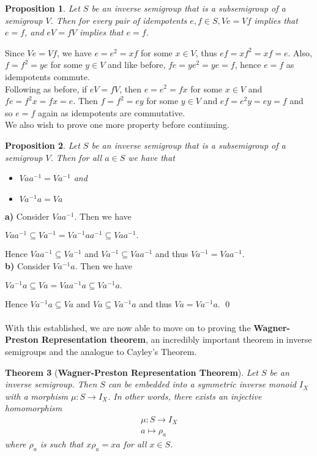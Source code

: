 \documentclass[12pt]{article}
\newtheorem{theorem}{Theorem}[subsection]
\newtheorem{prop}[theorem]{Proposition}
\begin{document}
\begin{prop}\label{prop4.4}
	Let $S$ be an inverse semigroup that is a subsemigroup of a semigroup $V$. Then for every pair of idempotents $e,f \in S, Ve = Vf$ implies that $e = f$, and $eV = fV$ implies that $e = f$.
\end{prop}
\proof
	Since $Ve = Vf$, we have $e = e^2 = xf$ for some $x \in V$, thus $ef = xf^2 = xf = e$. Also, $f = f^2 = ye$ for some $y \in V$ and like before, $fe = ye^2 = ye = f$, hence $e=f$ as idempotents commute.\\
	Following as before, if $eV = fV$, then $e = e^2 = fx$ for some $x \in V$ and $fe=f^2 x = fx = e$. Then $f = f^2 = ey$ for some $y \in V$ and $ef=e^2 y = ey = f$ and so $e = f$ again as idempotents are commutative.\\
We also wish to prove one more property before continuing.
\begin{prop}\label{prop4.5}
	Let $S$ be an inverse semigroup that is a subsemigroup of a semigroup $V$. Then for all $a \in S$ we have that
	\begin{itemize}
		\item[\textbf{a)}] $Vaa^{-1} = Va^{-1}$ and
		\item[\textbf{b)}] $Va^{-1}a = Va$
	\end{itemize}
\end{prop}
\proof
	\textbf{a)} Consider $Vaa^{-1}$. Then we have
	\begin{center}
		$Vaa^{-1} \subseteq Va^{-1} = Va^{-1}aa^{-1} \subseteq Vaa^{-1}.$
	\end{center}
	Hence $Vaa^{-1} \subseteq Va^{-1}$ and $Va^{-1} \subseteq Vaa^{-1}$ and thus $Va^{-1} = Vaa^{-1}$.
	\\\textbf{b)} Consider $Va^{-1}a$. Then we have
	\begin{center}
		$Va^{-1}a \subseteq Va = Vaa^{-1}a \subseteq Va^{-1}a.$
	\end{center}
	Hence $Va^{-1}a \subseteq Va$ and $Va \subseteq Va^{-1}a$ and thus $Va = Va^{-1}a$.
	\qed\\
\\With this established, we are now able to move on to proving the \textbf{Wagner-Preston Representation theorem}, an incredibly important theorem in inverse semigroups and the analogue to Cayley's Theorem.
\begin{theorem}[\textbf{Wagner-Preston Representation Theorem}]
	Let $S$ be an inverse semigroup. Then $S$ can be embedded into a symmetric inverse monoid $I_X$ with a morphism $\mu:S \to I_X$. In other words, there exists an injective homomorphism
		\begin{align*}
			\mu:S \to I_X\\
			a \mapsto \rho_a
		\end{align*}
	where $\rho_a$ is such that $x\rho_a = xa$ for all $x \in S$.
\end{theorem}
\end{document}
